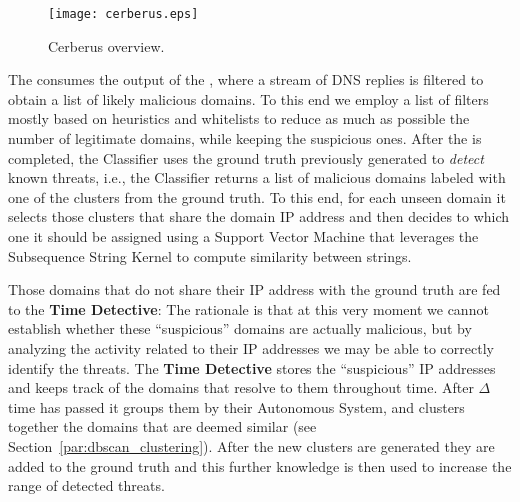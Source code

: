\begin{figure}[!htp]
    \centering
    \texttt{[image: cerberus.eps]}
    \caption{Cerberus overview.}
    \label{fig:cerberus_overview_approach}
\end{figure}

The  consumes the output of the , where a stream of
DNS replies is filtered to obtain a list of likely malicious domains. To this end
we employ a list of filters mostly based on heuristics and whitelists to reduce as
much as possible the number of legitimate domains, while keeping the suspicious
ones.
After the  is completed, the Classifier uses the
ground truth previously generated to \emph{detect} known threats, i.e., the Classifier returns a list of malicious domains labeled with one of the clusters from the ground truth. To this end,
for each unseen domain it selects those clusters that share the domain IP address
and then decides to which one  it should be assigned using a Support Vector Machine that leverages the Subsequence String Kernel to compute similarity between strings.

Those domains that do not share their IP address with the ground truth are fed to
the \textbf{Time Detective}: The rationale is that at this very moment we cannot establish whether these ``suspicious'' domains are actually malicious, but by analyzing the activity related to their IP addresses we may be able to correctly identify the threats. The \textbf{Time Detective} stores the ``suspicious'' IP addresses
and keeps track of the domains that resolve to them throughout time. After $\Delta$ time has passed it groups them by their Autonomous System,
and clusters together the domains that are deemed similar (see Section~\ref{par:dbscan_clustering}).
After the new clusters are generated they are added to the ground truth and this
further knowledge is then used to increase the range of detected threats.

